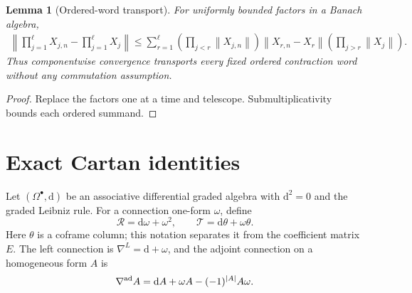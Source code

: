 \documentclass[11pt,a4paper,oneside]{book}
\theoremstyle{plain}
\newtheorem{lemma}[theorem]{Lemma}
\theoremstyle{definition}
\theoremstyle{remark}
\newcommand{\dd}{\mathrm d}
\newcommand{\norm}[1]{\left\lVert#1\right\rVert}
\newcommand{\src}[2]{\cite{#1}}
\begin{document}
\begin{lemma}[Ordered-word transport]
\label{lem:word-telescope}
For uniformly bounded factors in a Banach algebra,
\begin{equation}
\begin{split}
 \norm{\prod_{j=1}^{\ell}X_{j,n}-\prod_{j=1}^{\ell}X_j}
 \le\sum_{r=1}^{\ell}
 \left(\prod_{j<r}\norm{X_{j,n}}\right)
 \norm{X_{r,n}-X_r}
 \left(\prod_{j>r}\norm{X_j}\right).
\end{split}
 \label{eq:word-telescope}
\end{equation}
Thus componentwise convergence transports every fixed ordered contraction word without any commutation assumption.
\end{lemma}
\begin{proof}
Replace the factors one at a time and telescope. Submultiplicativity bounds each ordered summand.
\end{proof}
\src{R13}{lem:v13v96-word}

\section{Exact Cartan identities}
Let $(\Omega^\bullet,\dd)$ be an associative differential graded algebra with $\dd^2=0$ and the graded Leibniz rule. For a connection one-form $\omega$, define
\begin{equation}
 \mathcal R=\dd\omega+\omega^2,\qquad
 \mathcal T=\dd\theta+\omega\theta.
 \label{eq:ordered-curv}
\end{equation}
Here $\theta$ is a coframe column; this notation separates it from the coefficient matrix $E$. The left connection is $\nabla^L=\dd+\omega$, and the adjoint connection on a homogeneous form $A$ is
\begin{equation}
 \nabla^{\rm ad}A=\dd A+\omega A-(-1)^{|A|}A\omega.
\end{equation}
\end{document}
